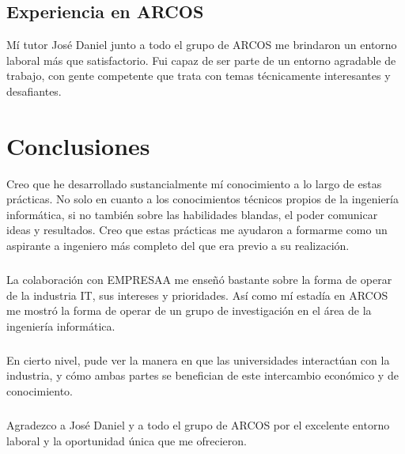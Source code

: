 \documentclass[12pt]{extreport} %
\begin{document}
\section{Experiencia en ARCOS}

Mí tutor José Daniel junto a todo el grupo de ARCOS me brindaron un
entorno laboral más que satisfactorio. Fui capaz de ser parte de un
entorno agradable de trabajo, con gente competente que trata con temas
técnicamente interesantes y desafiantes.

\chapter{Conclusiones}

Creo que he desarrollado sustancialmente mí conocimiento a lo largo de
estas prácticas. No solo en cuanto a los conocimientos técnicos
propios de la ingeniería informática, si no también sobre las
habilidades blandas, el poder comunicar ideas y resultados. Creo que
estas prácticas me ayudaron a formarme como un aspirante a ingeniero
más completo del que era previo a su realización.

\paragraph{}
La colaboración con EMPRESAA me enseñó bastante sobre la forma de
operar de la industria IT, sus intereses y prioridades. Así como mí
estadía en ARCOS me mostró la forma de operar de un grupo de
investigación en el área de la ingeniería informática.

\paragraph{}
En cierto nivel, pude ver la manera en que las universidades
interactúan con la industria, y cómo ambas partes se benefician de
este intercambio económico y de conocimiento.

\paragraph{}
Agradezco a José Daniel y a todo el grupo de ARCOS por el excelente
entorno laboral y la oportunidad única que me ofrecieron.
\end{document}
